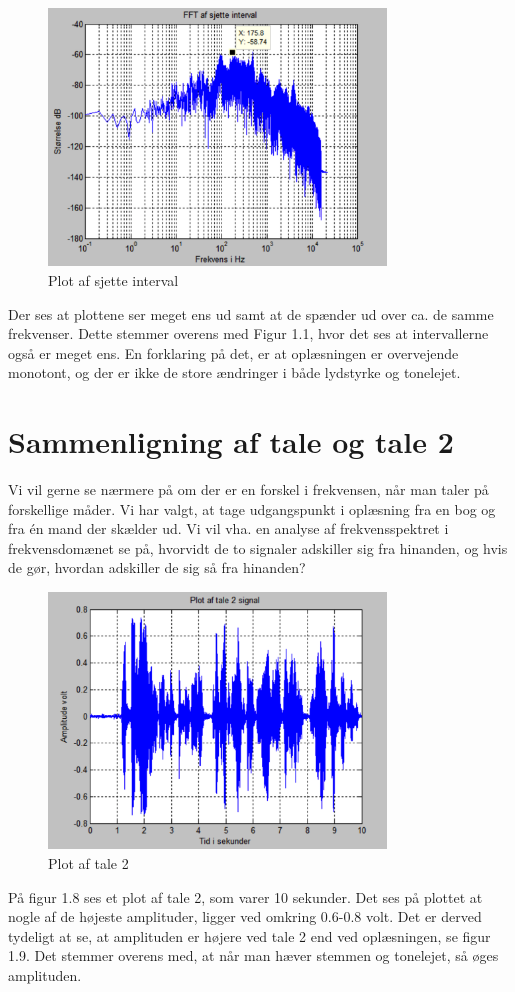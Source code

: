 \begin{figure}[H]
	\centering
	\includegraphics[width=0.8\textwidth]{Figur/Snip20151201_12}
	\caption{Plot af sjette interval}
\end{figure}

Der ses at plottene ser meget ens ud samt at de spænder ud over ca. de samme frekvenser. Dette stemmer overens med Figur 1.1, hvor det ses at intervallerne også er meget ens. En forklaring på det, er at oplæsningen er overvejende monotont, og der er ikke de store ændringer i både lydstyrke og tonelejet. 

\section{Sammenligning af tale og tale 2}
Vi vil gerne se nærmere på om der er en forskel i frekvensen, når man taler på forskellige måder. Vi har valgt, at tage udgangspunkt i oplæsning fra en bog og fra én mand der skælder ud. Vi vil vha. en analyse af frekvensspektret i frekvensdomænet se på, hvorvidt de to signaler adskiller sig fra hinanden, og hvis de gør, hvordan adskiller de sig så fra hinanden?

\begin{figure}[H]
	\centering
	\includegraphics[width=0.8\textwidth]{Figur/Snip20151201_13}
	\caption{Plot af tale 2}
\end{figure}
På figur 1.8 ses et plot af tale 2, som varer 10 sekunder. Det ses på plottet at nogle af de højeste amplituder, ligger ved omkring 0.6-0.8 volt. Det er derved tydeligt at se, at amplituden er højere ved tale 2 end ved oplæsningen, se figur 1.9. Det stemmer overens med, at når man hæver stemmen og tonelejet, så øges amplituden.

